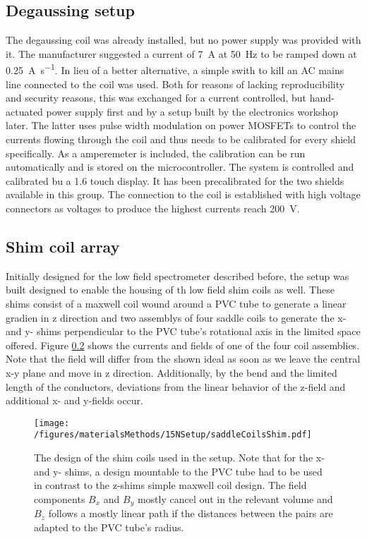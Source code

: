         \subsection{Degaussing setup}
        The degaussing coil was already installed, but no power supply was provided with it. The manufacturer suggested a current of \SI{7}{\ampere} at \SI{50}{\hertz} to be ramped down at \SI{0.25}{\ampere\per\second}. In lieu of a better alternative, a simple swith to kill an AC mains line connected to the coil was used. Both for reasons of lacking reproducibility and security reasons, this was exchanged for a current controlled, but hand-actuated power supply first and by a setup built by the electronics workshop later. The latter uses pulse width modulation on power MOSFETs to control the currents flowing through the coil and thus needs to be calibrated for every shield specifically. As a amperemeter is included, the calibration can be run automatically and is stored on the microcontroller. The system is controlled and calibrated bu a \SI{1.6}{\in} touch display. It has been precalibrated for the two shields available in this group. The connection to the coil is established with high voltage connectors as voltages to produce the highest currents reach \SI{200}{\volt}.
        \subsection{Shim coil array}
        Initially designed for the low field spectrometer described before, the setup was built designed to enable the housing of th low field shim coils as well. These shims consist of a maxwell coil wound around a PVC tube to generate a linear gradien in z direction and two assemblys of four saddle coils to generate the x- and y- shims perpendicular to the PVC tube's rotational axis in the limited space offered.
        Figure \ref{} shows the currents and fields of one of the four coil assemblies. Note that the field will differ from the shown ideal as soon as we leave the central x-y plane and move in z direction. Additionally, by the bend and the limited length of the conductors, deviations from the linear behavior of the z-field and additional x- and y-fields occur.
        \begin{figure}
            \texttt{[image: /figures/materialsMethods/15NSetup/saddleCoilsShim.pdf]}
            \caption[Shim coil design]{The design of the shim coils used in the setup. Note that for the x- and y- shims, a design mountable to the PVC tube had to be used in contrast to the z-shims simple maxwell coil design. The field components $B_x$ and $B_y$ mostly cancel out in the relevant volume and $B_z$ follows a mostly linear path if the distances between the pairs are adapted to the PVC tube's radius.}
        \end{figure}
